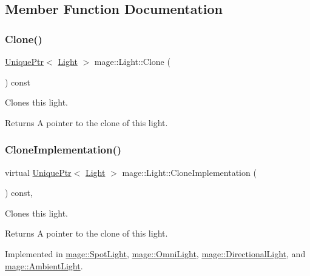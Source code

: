 \subsection{Member Function Documentation}
\hypertarget{classmage_1_1_light_a4c87e4a361b20519c49b4a0397625a6a}{}\label{classmage_1_1_light_a4c87e4a361b20519c49b4a0397625a6a} 
\subsubsection{\texorpdfstring{Clone()}{Clone()}}
{\footnotesize\ttfamily \hyperlink{namespacemage_a3316d7143a973e37adf1110f2e80ca31}{Unique\+Ptr}$<$ \hyperlink{classmage_1_1_light}{Light} $>$ mage\+::\+Light\+::\+Clone (\begin{DoxyParamCaption}{ }\end{DoxyParamCaption}) const}

Clones this light.

\begin{DoxyReturn}{Returns}
A pointer to the clone of this light. 
\end{DoxyReturn}
\hypertarget{classmage_1_1_light_aa613d76a1ebda69efde853d15f75490c}{}\label{classmage_1_1_light_aa613d76a1ebda69efde853d15f75490c} 
\subsubsection{\texorpdfstring{Clone\+Implementation()}{CloneImplementation()}}
{\footnotesize\ttfamily virtual \hyperlink{namespacemage_a3316d7143a973e37adf1110f2e80ca31}{Unique\+Ptr}$<$ \hyperlink{classmage_1_1_light}{Light} $>$ mage\+::\+Light\+::\+Clone\+Implementation (\begin{DoxyParamCaption}{ }\end{DoxyParamCaption}) const\hspace{0.3cm}{\ttfamily [private]}, {}}

Clones this light.

\begin{DoxyReturn}{Returns}
A pointer to the clone of this light. 
\end{DoxyReturn}


Implemented in \hyperlink{classmage_1_1_spot_light_a060044ae1de97143878ad26524f03709}{mage\+::\+Spot\+Light}, \hyperlink{classmage_1_1_omni_light_a1212457828cdd96cc7170767b7bd1223}{mage\+::\+Omni\+Light}, \hyperlink{classmage_1_1_directional_light_a122d3dcd7633a85ef8a85e7d768da36d}{mage\+::\+Directional\+Light}, and \hyperlink{classmage_1_1_ambient_light_a7223a4770653c20e662810b0956c6e51}{mage\+::\+Ambient\+Light}.

